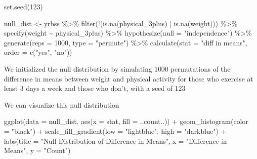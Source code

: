\documentclass[
]{article}
\newenvironment{Shaded}{\begin{snugshade}}{\end{snugshade}}
\newcommand{\AttributeTok}[1]{\textcolor[rgb]{0.77,0.63,0.00}{#1}}
\newcommand{\DecValTok}[1]{\textcolor[rgb]{0.00,0.00,0.81}{#1}}
\newcommand{\FunctionTok}[1]{\textcolor[rgb]{0.00,0.00,0.00}{#1}}
\newcommand{\NormalTok}[1]{#1}
\newcommand{\OtherTok}[1]{\textcolor[rgb]{0.56,0.35,0.01}{#1}}
\newcommand{\SpecialCharTok}[1]{\textcolor[rgb]{0.00,0.00,0.00}{#1}}
\newcommand{\StringTok}[1]{\textcolor[rgb]{0.31,0.60,0.02}{#1}}
\begin{document}
\begin{Shaded}
\begin{Highlighting}[]
\FunctionTok{set.seed}\NormalTok{(}\DecValTok{123}\NormalTok{)}

\NormalTok{null\_dist }\OtherTok{\textless{}{-}}\NormalTok{ yrbss }\SpecialCharTok{\%\textgreater{}\%}
  \FunctionTok{filter}\NormalTok{(}\SpecialCharTok{!}\NormalTok{(}\FunctionTok{is.na}\NormalTok{(physical\_3plus) }\SpecialCharTok{|} \FunctionTok{is.na}\NormalTok{(weight))) }\SpecialCharTok{\%\textgreater{}\%}
  \FunctionTok{specify}\NormalTok{(weight }\SpecialCharTok{\textasciitilde{}}\NormalTok{ physical\_3plus) }\SpecialCharTok{\%\textgreater{}\%}
  \FunctionTok{hypothesize}\NormalTok{(}\AttributeTok{null =} \StringTok{"independence"}\NormalTok{) }\SpecialCharTok{\%\textgreater{}\%}
  \FunctionTok{generate}\NormalTok{(}\AttributeTok{reps =} \DecValTok{1000}\NormalTok{, }\AttributeTok{type =} \StringTok{"permute"}\NormalTok{) }\SpecialCharTok{\%\textgreater{}\%}
  \FunctionTok{calculate}\NormalTok{(}\AttributeTok{stat =} \StringTok{"diff in means"}\NormalTok{, }\AttributeTok{order =} \FunctionTok{c}\NormalTok{(}\StringTok{"yes"}\NormalTok{, }\StringTok{"no"}\NormalTok{))}
\end{Highlighting}
\end{Shaded}

We initialized the null distribution by simulating 1000 permutations of
the difference in means between weight and physical activity for those
who exercise at least 3 days a week and those who don't, with a seed of
123

We can visualize this null distribution

\begin{Shaded}
\begin{Highlighting}[]
\FunctionTok{ggplot}\NormalTok{(}\AttributeTok{data =}\NormalTok{ null\_dist, }\FunctionTok{aes}\NormalTok{(}\AttributeTok{x =}\NormalTok{ stat, }\AttributeTok{fill =}\NormalTok{ ..count..)) }\SpecialCharTok{+}
  \FunctionTok{geom\_histogram}\NormalTok{(}\AttributeTok{color =} \StringTok{"black"}\NormalTok{) }\SpecialCharTok{+}
  \FunctionTok{scale\_fill\_gradient}\NormalTok{(}\AttributeTok{low =} \StringTok{"lightblue"}\NormalTok{, }\AttributeTok{high =} \StringTok{"darkblue"}\NormalTok{) }\SpecialCharTok{+}
  \FunctionTok{labs}\NormalTok{(}\AttributeTok{title =} \StringTok{"Null Distribution of Difference in Means"}\NormalTok{,}
       \AttributeTok{x =} \StringTok{"Difference in Means"}\NormalTok{,}
       \AttributeTok{y =} \StringTok{"Count"}\NormalTok{)}
\end{Highlighting}
\end{Shaded}
\end{document}
